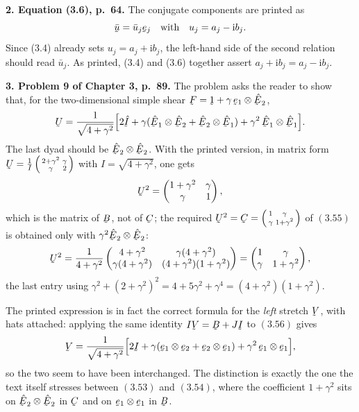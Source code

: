 \documentclass[12pt,a4paper]{article}
\DeclareRobustCommand{\vek}[1]{\underaccent{\tilde}{#1}}
\newcommand{\bu}{\vek{u}}
\newcommand{\bF}{\vek{F}}
\newcommand{\bC}{\vek{C}}
\newcommand{\hbE}{\hat{\vek{E}}}
\newcommand{\be}{\vek{e}}
\newcommand{\bU}{\vek{U}}
\newcommand{\hI}{\hat{\vek{I}}}
\newcommand{\bB}{\vek{B}}
\newcommand{\bV}{\vek{V}}
\newcommand{\I}{\vek{I}}
\newenvironment{query}[1]%
  {\par\medskip\noindent\textbf{#1}\quad}{\par\medskip}
\begin{document}
\begin{query}{2. Equation (3.6), p.~64.}
The conjugate components are printed as
\[
   \bar{\bu}=\bar u_j\be_j \quad\text{with}\quad u_j=a_j-\mathrm{i}b_j .
\]
Since (3.4) already sets $u_j=a_j+\mathrm{i}b_j$, the left-hand side of the
second relation should read $\bar u_j$. As printed, (3.4) and (3.6)
together assert $a_j+\mathrm{i}b_j=a_j-\mathrm{i}b_j$.
\end{query}

\begin{query}{3. Problem 9 of Chapter 3, p.~89.}
The problem asks the reader to show that, for the two-dimensional simple
shear $\bF=\vek{1}+\gamma\,\be_{1}\otimes\hbE_{2}$,
\[
   \bU=\frac{1}{\sqrt{4+\gamma^{2}}}
   \Big[2\hI+\gamma(\hbE_{1}\otimes\hbE_{2}+\hbE_{2}\otimes\hbE_{1})
   +\gamma^{2}\,\hbE_{1}\otimes\hbE_{1}\Big].
\]
The last dyad should be $\hbE_{2}\otimes\hbE_{2}$. With the printed
version, in matrix form
$\bU=\tfrac1I\left(\begin{smallmatrix}2+\gamma^{2}&\gamma\\
\gamma&2\end{smallmatrix}\right)$ with $I=\sqrt{4+\gamma^{2}}$, one gets
\[
   \bU^{2}=\begin{pmatrix}1+\gamma^{2}&\gamma\\ \gamma&1\end{pmatrix},
\]
which is the matrix of $\bB$, not of $\bC$; the required
$\bU^{2}=\bC=\left(\begin{smallmatrix}1&\gamma\\ \gamma&1+\gamma^{2}
\end{smallmatrix}\right)$ of $(3.55)$ is obtained only with
$\gamma^{2}\hbE_{2}\otimes\hbE_{2}$:
\[
   \bU^{2}=\frac{1}{4+\gamma^{2}}
   \begin{pmatrix}4+\gamma^{2}&\gamma(4+\gamma^{2})\\
   \gamma(4+\gamma^{2})&(4+\gamma^{2})(1+\gamma^{2})\end{pmatrix}
   =\begin{pmatrix}1&\gamma\\ \gamma&1+\gamma^{2}\end{pmatrix},
\]
the last entry using
$\gamma^{2}+(2+\gamma^{2})^{2}=4+5\gamma^{2}+\gamma^{4}
=(4+\gamma^{2})(1+\gamma^{2})$.

The printed expression is in fact the correct formula for the \emph{left}
stretch $\bV$, with hats attached: applying the same identity
$I\bV=\bB+J\I$ to $(3.56)$ gives
\[
   \bV=\frac{1}{\sqrt{4+\gamma^{2}}}
   \Big[2\I+\gamma(\be_{1}\otimes\be_{2}+\be_{2}\otimes\be_{1})
   +\gamma^{2}\,\be_{1}\otimes\be_{1}\Big],
\]
so the two seem to have been interchanged. The distinction is exactly the
one the text itself stresses between $(3.53)$ and $(3.54)$, where the
coefficient $1+\gamma^{2}$ sits on $\hbE_{2}\otimes\hbE_{2}$ in $\bC$ and
on $\be_{1}\otimes\be_{1}$ in $\bB$.
\end{query}
\end{document}
